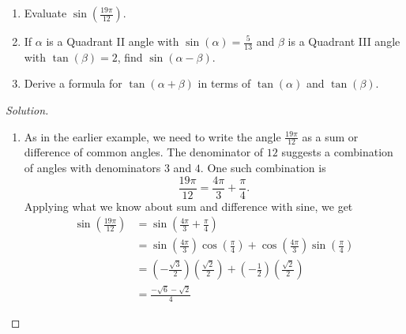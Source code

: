 \documentclass{ximera}
\begin{document}
\begin{example}
  \label{sinesumanddiffex}
  \begin{enumerate}
    \item  Evaluate \( \sin\left(\frac{19 \pi}{12}\right) \).
    \item  If \( \alpha \) is a Quadrant II angle with \( \sin(\alpha) = \frac{5}{13} \) and \( \beta \) is a Quadrant III angle with \( \tan(\beta) = 2 \), find \( \sin(\alpha - \beta) \).
    \item  Derive a formula for \( \tan(\alpha + \beta) \) in terms of \( \tan(\alpha) \) and \( \tan(\beta)\).
  \end{enumerate}
  \begin{proof}[Solution]
    \begin{enumerate}
      \item  As in the earlier example, we need to write the angle \( \frac{19 \pi}{12} \) as a sum or difference of common angles.
      The denominator of \( 12 \) suggests a combination of angles with denominators \( 3 \) and \( 4 \).
      One such combination is
      \[
        \frac{19 \pi}{12} = \frac{4 \pi}{3} + \frac{\pi}{4}.
      \]
      Applying what we know about sum and difference with sine, we get
      \begin{align*}
        \sin\left(\frac{19 \pi}{12}\right) &= \sin\left(\frac{4 \pi}{3} + \frac{\pi}{4} \right) \\[10pt]
        &= \sin\left(\frac{4 \pi}{3} \right)\cos\left(\frac{\pi}{4} \right) + \cos\left(\frac{4 \pi}{3} \right)\sin\left(\frac{\pi}{4} \right) \\[10pt]
        &= \left( -\frac{\sqrt{3}}{2} \right)\left( \frac{\sqrt{2}}{2} \right)  +  \left( -\frac{1}{2} \right)\left( \frac{\sqrt{2}}{2} \right) \\[15pt]
        &= \boxed{\frac{-\sqrt{6}- \sqrt{2}}{4}}
      \end{align*}


\end{enumerate}
\end{proof}
\end{example}
\end{document}
